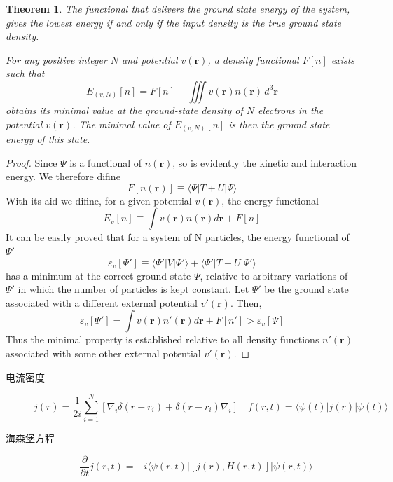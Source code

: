 \documentclass{article}
\newtheorem{theorem}{Theorem}[section]
\newtheorem{proof}{Proof}[section]
\numberwithin{equation}{section}
\newcommand{\bracketl}[3]{\langle #1 | #2 | #3 \rangle}
\newcommand{\grad}{\nabla}
\begin{document}
\begin{theorem}
The functional that delivers the ground state energy of the system, gives the lowest energy if and only if the input density is the true ground state density.

For any positive integer $N$ and potential $v(\textbf{r})$, a density functional $F[n]$ exists such that
\begin{equation}
E_{(v,N)}[n]=F[n]+\iiint v(\textbf{r})n(\textbf{r})\,d^3\textbf{r}
\end{equation}
obtains its minimal value at the ground-state density of $N$ electrons in the potential $v(\textbf{r})$. The minimal value of $E_{(v,N)}[n]$ is then the ground state energy of this state.

\end{theorem}

\begin{proof}
Since $\Psi$ is a functional of $n(\textbf{r})$, so is evidently the kinetic and interaction energy. We therefore difine 
\begin{equation}
F[n(\textbf{r})] \equiv \bracketl{\Psi}{T+U}{\Psi}
\end{equation}
With its aid we difine, for a given potential $v(\textbf{r})$, the energy functional
\begin{equation}
E_v[n]\equiv \int v(\textbf{r})n(\textbf{r})d\textbf{r} + F[n]
\end{equation}
It can be easily proved that for a system of N particles, the energy functional of $\Psi'$
\begin{equation}
\varepsilon_v[\Psi']\equiv\bracketl{\Psi'}{V}{\Psi'}+\bracketl{\Psi'}{T+U}{\Psi'}
\end{equation}
has a minimum at the correct ground state $\Psi$, relative to arbitrary variations of $\Psi'$ in which the number of particles is kept constant. Let $\Psi'$ be the ground state associated with a different external potential $v'(\textbf{r})$. Then,
\begin{equation}
\varepsilon_v[\Psi']=\int v(\textbf{r})n'(\textbf{r})d\textbf{r}+F[n']>\varepsilon_v[\Psi]
\end{equation}
Thus the minimal property is established relative to all density functions $n'(\textbf{r})$ associated with some other external potential $v'(\textbf{r})$.\cite{PhysRev.136.B864}
\end{proof}


\begin{description}
	\item[电流密度]
	\begin{equation}
	j(r)=\frac{1}{2i}\sum_{i=1}^{N}[\grad_i\delta(r-r_i)+\delta(r-r_i)\grad_i]\quad f(r,t)=\bracketl{\psi(t)}{j(r)}{\psi(t)}\end{equation}


	 \item[海森堡方程]
	 \begin{equation}
	 \frac{\partial}{\partial t}j(r,t)=-i\bracketl{\psi(r,t)}{[j(r),H(r,t)]}{\psi(r,t)}
	 \end{equation}


\end{description}
\end{document}
